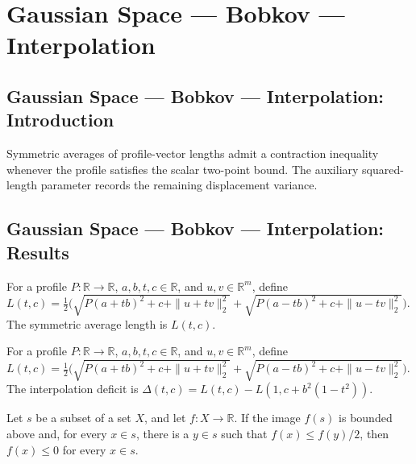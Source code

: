 \section{Gaussian Space --- Bobkov --- Interpolation}
\subsection*{Gaussian Space --- Bobkov --- Interpolation: Introduction}
Symmetric averages of profile-vector lengths admit a contraction inequality whenever the profile satisfies the scalar two-point bound. The auxiliary squared-length parameter records the remaining displacement variance.

\subsection*{Gaussian Space --- Bobkov --- Interpolation: Results}

\begin{definition}
\leanok
{}
For a profile $P:\mathbb R\to\mathbb R$, $a,b,t,c\in\mathbb R$, and $u,v\in\mathbb R^m$, define $L(t,c)=\frac12\bigl(\sqrt{P(a+tb)^2+c+\|u+tv\|_2^2}+\sqrt{P(a-tb)^2+c+\|u-tv\|_2^2}\bigr)$. The symmetric average length is $L(t,c)$.
\end{definition}

\begin{definition}
\leanok
{}
For a profile $P:\mathbb R\to\mathbb R$, $a,b,t,c\in\mathbb R$, and $u,v\in\mathbb R^m$, define $L(t,c)=\frac12\bigl(\sqrt{P(a+tb)^2+c+\|u+tv\|_2^2}+\sqrt{P(a-tb)^2+c+\|u-tv\|_2^2}\bigr)$. The interpolation deficit is $\Delta(t,c)=L(t,c)-L(1,c+b^2(1-t^2))$.
\end{definition}

\begin{lemma}
\leanok
{}
Let $s$ be a subset of a set $X$, and let $f:X\to\mathbb R$. If the image $f(s)$ is
bounded above and, for every $x\in s$, there is a $y\in s$ such that $f(x)\le f(y)/2$,
then $f(x)\le0$ for every $x\in s$.
\end{lemma}

